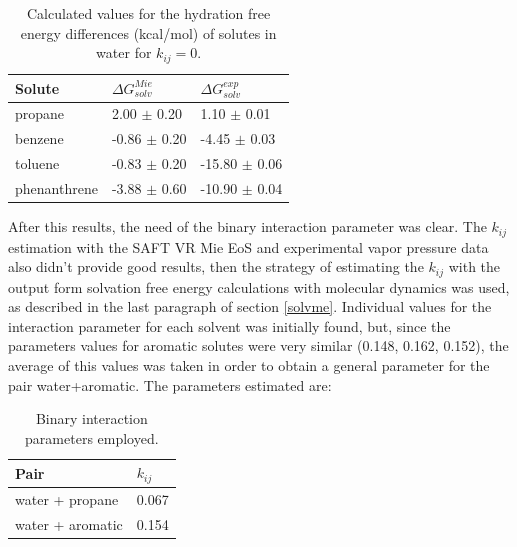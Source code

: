 \FloatBarrier
\begin{table}[h]
	\centering
	\caption{Calculated values for the hydration free energy differences (kcal/mol) of solutes in water for $k_{ij}=0$.}
	\label{tbl:solv3}
	\begin{tabular}{lll}
		\hline
		Solute & $\Delta G_{solv}^{Mie}$ & $\Delta G_{solv}^{exp}$ \\
		\hline
		propane   & 2.00 $\pm$ 0.20&1.10 $\pm$ 0.01   \\
		benzene  & -0.86 $\pm$ 0.20 & -4.45 $\pm$ 0.03   \\
		toluene  & -0.83 $\pm$ 0.20 &-15.80 $\pm$ 0.06   \\
		phenanthrene & -3.88 $\pm$ 0.60 &-10.90 $\pm$ 0.04   \\
		\hline
	\end{tabular}
\end{table}
\FloatBarrier

After this results, the need of  the binary interaction parameter was clear. The $k_{ij}$ estimation with the SAFT VR Mie EoS and experimental vapor pressure data also didn't provide good results, then the strategy of estimating the $k_{ij}$ with the output form solvation free energy calculations with molecular dynamics was used, as described in the last paragraph of section \ref{solvme}.  Individual values for the interaction parameter for each solvent was initially found, but, since the parameters values for aromatic solutes were very similar (0.148, 0.162, 0.152), the average of this values was taken in order to obtain a general parameter for the pair water+aromatic. The parameters estimated are:

\begin{table}[h]
  \centering
  \caption{Binary interaction parameters employed.}
  \label{tbl:kij}
  \begin{tabular}{ll}
    \hline
      Pair & $k_{ij}$ \\
    \hline
    water  + propane      & 0.067  \\
    water  + aromatic      & 0.154 \\  
    \hline
  \end{tabular}
\end{table}

